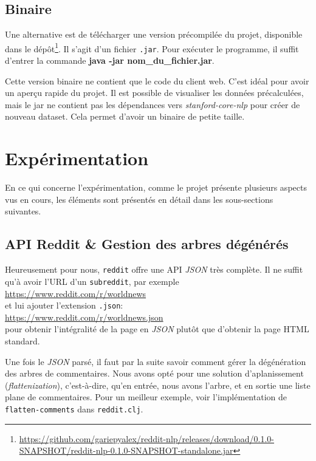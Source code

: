 \documentclass[12pt]{article}
\begin{document}
\subsection{Binaire}
Une alternative est de télécharger une version précompilée du projet, disponible dans le dépôt\footnote{\url{https://github.com/gariepyalex/reddit-nlp/releases/download/0.1.0-SNAPSHOT/reddit-nlp-0.1.0-SNAPSHOT-standalone.jar}}. Il s'agit d'un fichier \verb;.jar;. Pour exécuter le programme, il
suffit d'entrer la commande \textbf{java -jar nom\_du\_fichier.jar}.

Cette version binaire ne contient que le code du client web. C'est idéal pour avoir un aperçu rapide du projet. Il est possible de visualiser les données précalculées, mais le jar ne contient pas les dépendances
vers \emph{stanford-core-nlp} pour créer de nouveau dataset. Cela permet d'avoir un binaire de petite taille.

\section{Expérimentation}

En ce qui concerne l'expérimentation, comme le projet présente plusieurs aspects vus en cours, les éléments sont présentés en détail dans les sous-sections suivantes.

\subsection{API Reddit \& Gestion des arbres dégénérés}
\label{sec:api-reddit}

Heureusement pour nous, \verb;reddit; offre une API \textit{JSON} très complète. Il ne suffit qu'à avoir l'URL d'un \verb;subreddit;, par exemple\\

\url{https://www.reddit.com/r/worldnews}\\

et lui ajouter l'extension \verb;.json;:\\

\url{https://www.reddit.com/r/worldnews.json}\\

pour obtenir l'intégralité de la page en \textit{JSON} plutôt que d'obtenir la page HTML standard.

Une fois le \textit{JSON} parsé, il faut par la suite savoir comment gérer la dégénération des arbres de commentaires. Nous avons opté pour une solution d'aplanissement (\textit{flattenization}), c'est-à-dire, qu'en entrée, nous avons l'arbre, et en sortie une liste plane de commentaires. Pour un meilleur exemple, voir l'implémentation de \verb;flatten-comments; dans \verb;reddit.clj;.
\end{document}
